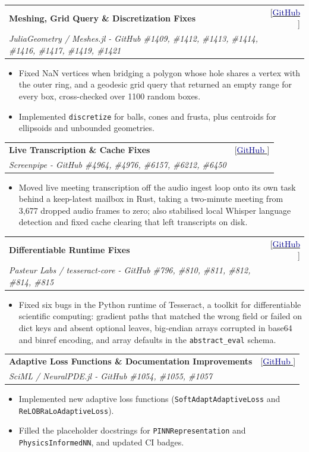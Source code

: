 \documentclass[a4paper,10pt]{article}
\makeatletter
\newcommand{\resumeProject}[4]{
  \item
    \begin{tabular*}{0.98\textwidth}[t]{l@{\extracolsep{\fill}}r}
      \textbf{#1} & \footnotesize{#3} \\[2pt]
      \footnotesize{\textit{#2}} & \footnotesize{#4}
    \end{tabular*}
}
\newcommand{\resumeItemListStart}{\vspace{-1.5mm}\begin{itemize}[leftmargin=*,labelsep=1mm,itemsep=1pt,topsep=0pt,parsep=0mm,partopsep=0mm]}
\newcommand{\resumeItemListEnd}{\end{itemize}\vspace{0mm}}
\makeatother
\begin{document}
\resumeProject
  {Meshing, Grid Query \& Discretization Fixes}
  {JuliaGeometry / Meshes.jl - GitHub \#1409, \#1412, \#1413, \#1414, \#1416, \#1417, \#1419, \#1421}
  {{}[\href{https://github.com/JuliaGeometry/Meshes.jl/pulls?q=author:jitendravjh}{\textcolor{darkblue}{GitHub }{\faGithub}}]}
  {}
\resumeItemListStart
  \item Fixed NaN vertices when bridging a polygon whose hole shares a vertex with the outer ring, and a geodesic grid query that returned an empty range for every box, cross-checked over 1100 random boxes.
  \item Implemented \texttt{discretize} for balls, cones and frusta, plus centroids for ellipsoids and unbounded geometries.
\resumeItemListEnd

\resumeProject
  {Live Transcription \& Cache Fixes}
  {Screenpipe - GitHub \#4964, \#4976, \#6157, \#6212, \#6450}
  {{}[\href{https://github.com/screenpipe/screenpipe/pulls?q=author:jitendravjh}{\textcolor{darkblue}{GitHub }{\faGithub}}]}
  {}
\resumeItemListStart
  \item Moved live meeting transcription off the audio ingest loop onto its own task behind a keep-latest mailbox in Rust, taking a two-minute meeting from 3,677 dropped audio frames to zero; also stabilised local Whisper language detection and fixed cache clearing that left transcripts on disk.
\resumeItemListEnd

\resumeProject
  {Differentiable Runtime Fixes}
  {Pasteur Labs / tesseract-core - GitHub \#796, \#810, \#811, \#812, \#814, \#815}
  {{}[\href{https://github.com/pasteurlabs/tesseract-core/pulls?q=is:pr+author:jitendravjh}{\textcolor{darkblue}{GitHub }{\faGithub}}]}
  {}
\resumeItemListStart
  \item Fixed six bugs in the Python runtime of Tesseract, a toolkit for differentiable scientific computing: gradient paths that matched the wrong field or failed on dict keys and absent optional leaves, big-endian arrays corrupted in base64 and binref encoding, and array defaults in the \texttt{abstract\_eval} schema.
\resumeItemListEnd

\resumeProject
  {Adaptive Loss Functions \& Documentation Improvements}
  {SciML / NeuralPDE.jl - GitHub \#1054, \#1055, \#1057}
  {{}[\href{https://github.com/SciML/NeuralPDE.jl/pulls?q=author:jitendravjh}{\textcolor{darkblue}{GitHub }{\faGithub}}]}
  {}
\resumeItemListStart
  \item Implemented new adaptive loss functions (\texttt{SoftAdaptAdaptiveLoss} and \texttt{ReLOBRaLoAdaptiveLoss}).
  \item Filled the placeholder docstrings for \texttt{PINNRepresentation} and \texttt{PhysicsInformedNN}, and updated CI badges.
\resumeItemListEnd
\end{document}
